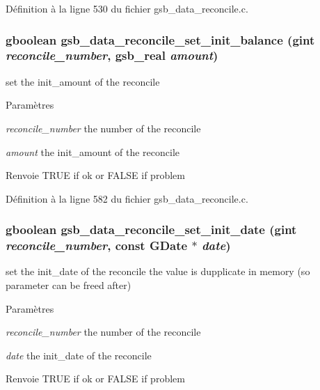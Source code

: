 Définition à la ligne 530 du fichier gsb\_\-data\_\-reconcile.c.

\subsubsection[{gsb\_\-data\_\-reconcile\_\-set\_\-init\_\-balance}]{\setlength{\rightskip}{0pt plus 5cm}gboolean gsb\_\-data\_\-reconcile\_\-set\_\-init\_\-balance (gint {\em reconcile\_\-number}, \/  {\bf gsb\_\-real} {\em amount})}\label{gsb__data__reconcile_8h_ae00b62ef7aed10eaa1436c833fe8da0c}
set the init\_\-amount of the reconcile


\begin{DoxyParams}{Paramètres}
\item[{\em reconcile\_\-number}]the number of the reconcile \item[{\em amount}]the init\_\-amount of the reconcile\end{DoxyParams}
\begin{DoxyReturn}{Renvoie}
TRUE if ok or FALSE if problem 
\end{DoxyReturn}


Définition à la ligne 582 du fichier gsb\_\-data\_\-reconcile.c.

\subsubsection[{gsb\_\-data\_\-reconcile\_\-set\_\-init\_\-date}]{\setlength{\rightskip}{0pt plus 5cm}gboolean gsb\_\-data\_\-reconcile\_\-set\_\-init\_\-date (gint {\em reconcile\_\-number}, \/  const GDate $\ast$ {\em date})}\label{gsb__data__reconcile_8h_a804d3e97ad7b144a45a11f9786cc1b80}
set the init\_\-date of the reconcile the value is dupplicate in memory (so parameter can be freed after)


\begin{DoxyParams}{Paramètres}
\item[{\em reconcile\_\-number}]the number of the reconcile \item[{\em date}]the init\_\-date of the reconcile\end{DoxyParams}
\begin{DoxyReturn}{Renvoie}
TRUE if ok or FALSE if problem 
\end{DoxyReturn}


